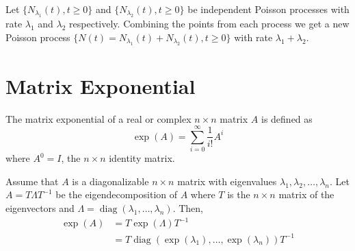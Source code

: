 \begin{theorem} \label{thm:poisson_super}
Let $\{N_{\lambda_1}(t), t \geq 0\}$ and $\{N_{\lambda_2}(t), t \geq 0\}$ be independent Poisson processes with rate $\lambda_1$ and $\lambda_2$ respectively.
Combining the points from each process we get a new Poisson process $\{N(t) = N_{\lambda_1}(t) + N_{\lambda_2}(t), t \geq 0\}$ with rate $\lambda_1 + \lambda_2$.
\end{theorem}

\section{Matrix Exponential}

\begin{defn}
The matrix exponential of a real or complex $n \times n$ matrix $A$ is defined as
$$
\exp(A) = \sum_{i = 0}^\infty \frac{1}{i!} A^i
$$
where $A^0 = I$, the $n \times n$ identity matrix.
\end{defn}

\begin{theorem} \label{thm:eigen_matrix_exp}
Assume that $A$ is a diagonalizable $n \times n$ matrix with eigenvalues $\lambda_1, \lambda_2, \ldots, \lambda_n$.
Let $A = T \Lambda T^{-1}$ be the eigendecomposition of $A$ where $T$ is the $n \times n$ matrix of the eigenvectors and $\Lambda = \operatorname{diag}(\lambda_1, \ldots, \lambda_n)$.
Then,
\begin{align*}
    \exp(A) &= T \exp(\Lambda) T^{-1}\\
    &= T \operatorname{diag}(\exp(\lambda_1), \ldots, \exp(\lambda_n)) T^{-1}
\end{align*}
\end{theorem}